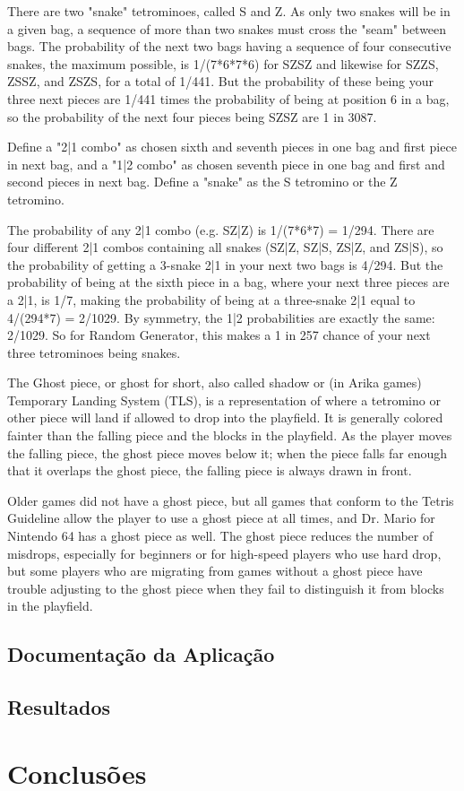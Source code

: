 \documentclass[
	12pt,				%
	openright,			%
	oneside,			%
	a4paper,			%
	brazil,				%
	]{abntex2}
\begin{document}
There are two "snake" tetrominoes, called S and Z. As only two snakes will be in a given bag, a sequence of more than two snakes must cross the "seam" between bags. The probability of the next two bags having a sequence of four consecutive snakes, the maximum possible, is 1/(7*6*7*6) for SZSZ and likewise for SZZS, ZSSZ, and ZSZS, for a total of 1/441. But the probability of these being your three next pieces are 1/441 times the probability of being at position 6 in a bag, so the probability of the next four pieces being SZSZ are 1 in 3087.

Define a "2|1 combo" as chosen sixth and seventh pieces in one bag and first piece in next bag, and a "1|2 combo" as chosen seventh piece in one bag and first and second pieces in next bag. Define a "snake" as the S tetromino or the Z tetromino.

The probability of any 2|1 combo (e.g. SZ|Z) is 1/(7*6*7) = 1/294. There are four different 2|1 combos containing all snakes (SZ|Z, SZ|S, ZS|Z, and ZS|S), so the probability of getting a 3-snake 2|1 in your next two bags is 4/294. But the probability of being at the sixth piece in a bag, where your next three pieces are a 2|1, is 1/7, making the probability of being at a three-snake 2|1 equal to 4/(294*7) = 2/1029. By symmetry, the 1|2 probabilities are exactly the same: 2/1029. So for Random Generator, this makes a 1 in 257 chance of your next three tetrominoes being snakes.

The Ghost piece, or ghost for short, also called shadow or (in Arika games) Temporary Landing System (TLS), is a representation of where a tetromino or other piece will land if allowed to drop into the playfield. It is generally colored fainter than the falling piece and the blocks in the playfield. As the player moves the falling piece, the ghost piece moves below it; when the piece falls far enough that it overlaps the ghost piece, the falling piece is always drawn in front.

Older games did not have a ghost piece, but all games that conform to the Tetris Guideline allow the player to use a ghost piece at all times, and Dr. Mario for Nintendo 64 has a ghost piece as well. The ghost piece reduces the number of misdrops, especially for beginners or for high-speed players who use hard drop, but some players who are migrating from games without a ghost piece have trouble adjusting to the ghost piece when they fail to distinguish it from blocks in the playfield.

\section{Documentação da Aplicação}



\section{Resultados}

\chapter{Conclusões} 
\end{document}
